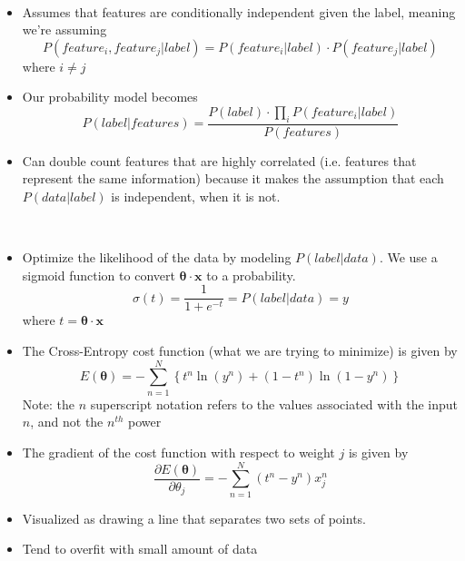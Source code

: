 \documentclass[12pt]{article}
\newenvironment{concept}[1]{\begin{trivlist}
		\item[\hskip \labelsep {\bfseries #1}]}{\end{trivlist}}
\begin{document}
\begin{concept}{Naive Bayes}
	\
	\begin{itemize}
		\item {
			Assumes that features are conditionally independent given the label, meaning we're assuming
			$$P(feature_i, feature_j | label) = P(feature_i | label) \cdot P(feature_j | label)$$
			where $i \neq j$
		}
		\item {
			Our probability model becomes
			$$P(label | features) = \frac{P(label) \cdot \prod_{i}^{} P(feature_i | label)}{P(features)}$$
		}
		\item {
			Can double count features that are highly correlated (i.e. features that represent the same information) because it makes
			the assumption that each $P(data | label)$ is independent, when it is not.
		}
	\end{itemize}
\end{concept}

\begin{concept}{Logistic Regression}
	\
	\begin{itemize}
		\item {
			Optimize the likelihood of the data by modeling $P(label | data)$. We use a sigmoid function to convert $ \boldsymbol{\theta} \cdot \boldsymbol{x}$ to a probability.
			$$\sigma(t) = \frac{1}{1 + e^{-t}} = P(label | data) = y$$
			where $t = \boldsymbol{\theta} \cdot \boldsymbol{x}$
		}
		\item {
			The Cross-Entropy cost function (what we are trying to minimize) is given by
			$$E(\boldsymbol{\theta}) = - \sum_{n=1}^{N} \left\{ t^n \ln(y^n) + (1-t^n) \ln(1-y^n) \right\}$$
			Note: the $n$ superscript notation refers to the values associated with the input $n$, and not the $n^{th}$ power
		}
		\item {
			The gradient of the cost function with respect to weight $j$ is given by
			$$\frac{\partial E(\boldsymbol{\theta})}{\partial \theta_j} = - \sum_{n=1}^{N} (t^n - y^n) x_j^n$$
		}
		\item {
			Visualized as drawing a line that separates two sets of points.
		}
		\item {
			Tend to overfit with small amount of data
		}
	\end{itemize}
\end{concept}
\end{document}
